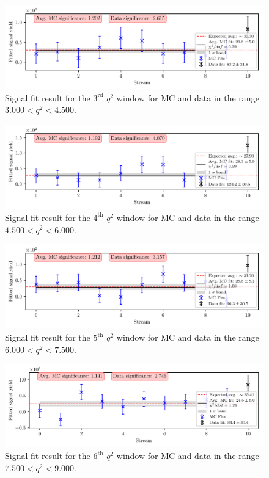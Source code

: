 \begin{figure}[H]
	\centering
	\captionsetup{width=0.8\linewidth}
	\includegraphics[width=\linewidth]{fig/sig_q2_3}
	\caption{Signal fit result for the $3^{\mathrm{rd}}$ $q^2$ window for MC and data in the range $3.000  < q^2 < 4.500$.}
\end{figure}

\begin{figure}[H]
	\centering
	\captionsetup{width=0.8\linewidth}
	\includegraphics[width=\linewidth]{fig/sig_q2_4}
	\caption{Signal fit result for the $4^{\mathrm{th}}$ $q^2$ window for MC and data in the range $4.500  < q^2 < 6.000$.}
\end{figure}

\begin{figure}[H]
	\centering
	\captionsetup{width=0.8\linewidth}
	\includegraphics[width=\linewidth]{fig/sig_q2_5}
	\caption{Signal fit result for the $5^{\mathrm{th}}$ $q^2$ window for MC and data in the range $6.000  < q^2 < 7.500$.}
\end{figure}

\begin{figure}[H]
	\centering
	\captionsetup{width=0.8\linewidth}
	\includegraphics[width=\linewidth]{fig/sig_q2_6}
	\caption{Signal fit result for the $6^{\mathrm{th}}$ $q^2$ window for MC and data in the range $7.500  < q^2 < 9.000$.}
\end{figure}

